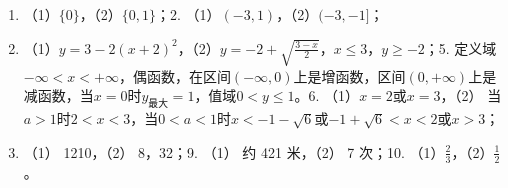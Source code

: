 \begin{enumerate}
\item
  （1）\(\{0\}\)，（2）\(\{0, 1\}\)；2.
  （1）\((-3, 1)\)，（2）\((-3, -1]\)；
\item
  （1）\(y = 3 - 2(x + 2)^2\)，（2）\(y = -2 + \sqrt{\frac{3 - x}{2}}\)，\(x \leqslant 3\)，\(y \geqslant -2\)；5.
  定义域\(-\infty < x < +\infty\)，偶函数，在区间\((-\infty, 0)\)上是增函数，区间\((0, +\infty)\)上是减函数，当\(x = 0\)时\(y_{\text{最大}} = 1\)，值域\(0 < y \leqslant 1\)。6.
  （1）\(x = 2\)或\(x = 3\)，（2）
  当\(a > 1\)时\(2 < x < 3\)，当\(0 < a < 1\)时\(x < -1 - \sqrt{6}\)或\(-1 + \sqrt{6} < x < 2\)或\(x > 3\)；
\item
  （1） 1210，（2） 8，32；9. （1） 约 421 米，（2） 7 次；10.
  （1）\(\frac{2}{3}\)，（2）\(\frac{1}{2}\)。
\end{enumerate}
